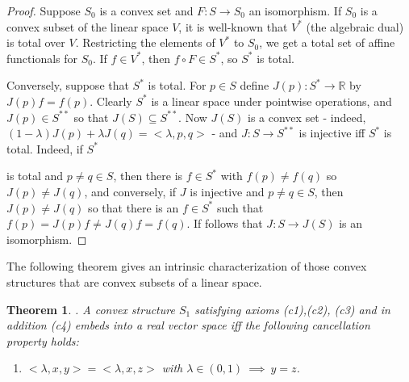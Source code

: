 \documentclass[12pt,letterpaper]{article}
\newtheorem{theorem}[lemma]{Theorem}
\begin{document}
\begin{proof} Suppose $S_0$ is a convex set and $F:S\to S_0$ an isomorphism. If $S_0$ is a convex subset of the linear space $V$, it is well-known that $V^*$ (the algebraic dual)
is total over $V$. Restricting the elements of $V^*$ to $S_0$, we get a total set of affine functionals for $S_0$. If $f\in V^*$, then $f\circ F\in S^*$, so $S^*$ is total.

Conversely, suppose that $S^*$ is total. For $p\in S$ define $J(p):S^*\to {\mathbb R}$ by $J(p)f=f(p)$. Clearly $S^*$ is a linear space under pointwise operations, and $J(p)\in S^{**}$ so that $J(S)\subseteq S^{**}$. Now $J(S)$ is a convex set - indeed, $(1-\lambda )J(p)+\lambda J(q)=<\lambda, p,q>$ -  and $J:S \to S^{**}$ is injective iff $S^*$ is total. Indeed, if $S^*$

is total and $p\neq q \in S$, then there is $f\in S^*$ with $f(p)\ne f(q)$ so $J(p)\neq J(q)$, and conversely, if $J$ is injective and $p\neq q\in S$,  then $J(p)\neq J(q)$ so that there is an $f\in S^*$ such that $f(p)=J(p)f\neq J(q)f= f(q)$. If follows that $J:S \to J(S)$ is an isomorphism.
\end{proof}




The following theorem gives an intrinsic characterization of those convex structures that are convex subsets of a linear space.

\begin{theorem}\label{th:intrinsic} \cite{S,CF}. A convex structure $S_1$  satisfying axioms \rm{(c1),(c2), (c3)} and in addition \rm{(c4)} embeds into a real vector space
iff the following cancellation property holds:
\begin{enumerate}
\item[(c5)] $<\lambda,x,y>=<\lambda,x,z>$ with $\lambda \in (0,1) \ \implies \ y=z$.
\end{enumerate}
\end{theorem}
\end{document}
